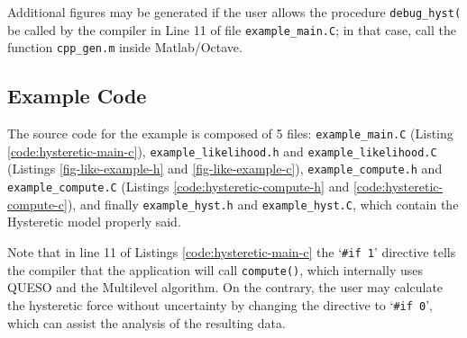 Additional figures may be generated if the user allows the procedure \texttt{debug\_hyst(} be called by the compiler in Line 11 of file \texttt{example\_main.C}; in that case, call the function \texttt{cpp\_gen.m} inside Matlab/Octave.


\subsection{Example Code}\label{sec:hysteretic-code}

The source code for the example is composed of 5 files:
\texttt{example\_main.C} (Listing \ref{code:hysteretic-main-c}), \linebreak
\texttt{example\_likelihood.h} and \texttt{example\_likelihood.C} (Listings \ref{fig-like-example-h} and \ref{fig-like-example-c}),
\texttt{example\_compute.h} and \texttt{example\_compute.C} (Listings \ref{code:hysteretic-compute-h} and \ref{code:hysteretic-compute-c}), and finally \texttt{example\_hyst.h} and \texttt{example\_hyst.C}, which contain the Hysteretic model properly said.


Note that in line 11 of Listings \ref{code:hysteretic-main-c} the `\verb+#if 1+' directive tells the compiler that the application will call \texttt{compute()}, which internally uses QUESO and the Multilevel algorithm.
On the contrary, the user may calculate the hysteretic force without uncertainty by changing the directive to `\verb+#if 0+', which can assist the analysis of the resulting data.













